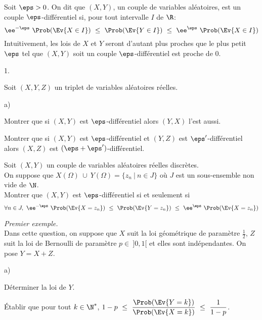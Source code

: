 \noindent
Soit $\eps>0$. On dit que $(X,Y)$, un couple de variables aléatoires,
est un couple $\eps$-différentiel si, pour tout intervalle $I$ de
$\R$:
\[
\ee^{-\eps} \ \Prob(\Ev{X\in I}) \ \leq \ \Prob(\Ev{Y \in I}) \ \leq \
\ee^{\eps} \ \Prob(\Ev{X\in I})
\]
Intuitivement, les lois de $X$ et $Y$ seront d'autant plus proches que
le plus petit $\eps$ tel que $(X,Y)$ soit un couple
$\eps$-différentiel est proche de $0$.
\begin{noliste}{1.}
  \setlength{\itemsep}{4mm} %
  \setcounter{enumi}{5}
\item Soit $(X,Y,Z)$ un triplet de variables aléatoires réelles.
  \begin{noliste}{a)}
    \setlength{\itemsep}{2mm} %
  \item Montrer que si $(X,Y)$ est $\eps$-différentiel alors $(Y,X)$
    l'est aussi.

    
    
    
    
    

  \item Montrer que si $(X,Y)$ est $\eps$-différentiel et $(Y,Z)$ est
    $\eps'$-différentiel alors $(X,Z)$ est $(\eps +
    \eps')$-différentiel.

    
  \end{noliste}

\item Soit $(X,Y)$ un couple de variables aléatoires réelles
  discrètes.\\
  On suppose que $X(\Omega) \ \cup \ Y(\Omega) = \{z_n \ |
  \ n\in J\}$ où $J$ est un sous-ensemble non vide de $\N$.\\[.2cm]
  Montrer que $(X,Y)$ est $\eps$-différentiel si et seulement si
  \[
  \forall n\in J, \ \ee^{-\eps} \ \Prob(\Ev{X=z_n}) \ \leq \
  \Prob(\Ev{Y=z_n}) \ \leq \ \ee^{\eps} \ \Prob(\Ev{X = z_n})
  \]

  

\item {\em Premier exemple.}\\
  Dans cette question, on suppose que $X$ suit la loi géométrique de
  paramètre $\frac{1}{2}$, $Z$ suit la loi de Bernoulli de paramètre
  $p \in \ ]0,1[$ et elles sont indépendantes. On pose $Y = X + Z$.
  \begin{noliste}{a)}
    \setlength{\itemsep}{2mm} %
  \item Déterminer la loi de $Y$.

    

  \item Établir que pour tout $k\in\N^*$, $1-p \ \leq \
    \dfrac{\Prob(\Ev{Y = k})}{\Prob(\Ev{X = k})} \ \leq \
    \dfrac{1}{1-p}$.


\end{noliste}
\end{noliste}

